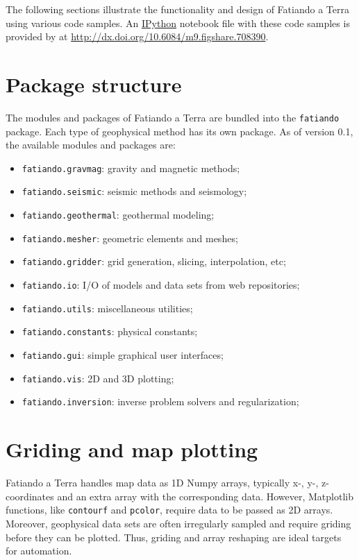The following sections illustrate the functionality and design of
Fatiando a Terra using various code samples. An
\href{http://ipython.org/}{IPython} \citep{perez2007} notebook file with these
code samples is provided by \citet{uieda2013} at
\url{http://dx.doi.org/10.6084/m9.figshare.708390}.



\section{Package structure}

The modules and packages of Fatiando a Terra are bundled into the
\texttt{fatiando} package. Each type of geophysical method has its own
package. As of version 0.1, the available modules and packages are:

\begin{itemize}
\item
  \texttt{fatiando.gravmag}: gravity and magnetic methods;
\item
  \texttt{fatiando.seismic}: seismic methods and seismology;
\item
  \texttt{fatiando.geothermal}: geothermal modeling;
\item
  \texttt{fatiando.mesher}: geometric elements and meshes;
\item
  \texttt{fatiando.gridder}: grid generation, slicing, interpolation,
  etc;
\item
  \texttt{fatiando.io}: I/O of models and data sets from web
  repositories;
\item
  \texttt{fatiando.utils}: miscellaneous utilities;
\item
  \texttt{fatiando.constants}: physical constants;
\item
  \texttt{fatiando.gui}: simple graphical user interfaces;
\item
  \texttt{fatiando.vis}: 2D and 3D plotting;
\item
  \texttt{fatiando.inversion}: inverse problem solvers and
  regularization;
\end{itemize}

\section{Griding and map plotting}

Fatiando a Terra handles map data as 1D Numpy arrays, typically x-, y-,
z-coordinates and an extra array with the corresponding data. However,
Matplotlib functions, like \texttt{contourf} and \texttt{pcolor},
require data to be passed as 2D arrays. Moreover, geophysical data sets
are often irregularly sampled and require griding before they can be
plotted. Thus, griding and array reshaping are ideal targets for
automation.

